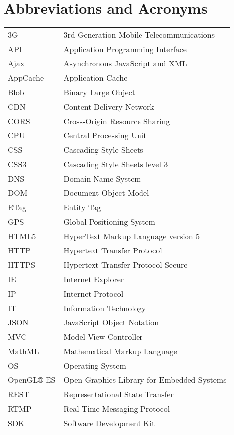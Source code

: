\chapter*{Abbreviations and Acronyms}

\noindent
\begin{longtable}{@{}p{}p{}@{}}

3G & 3rd Generation Mobile Telecommunications\\
API & Application Programming Interface\\
Ajax & Asynchronous JavaScript and XML\\
AppCache & Application Cache\\
Blob & Binary Large Object\\
CDN & Content Delivery Network\\
CORS & Cross-Origin Resource Sharing\\
CPU & Central Processing Unit\\
CSS & Cascading Style Sheets\\
CSS3 & Cascading Style Sheets level 3\\
DNS & Domain Name System\\
DOM & Document Object Model\\
ETag & Entity Tag\\
GPS & Global Positioning System\\
HTML5 & HyperText Markup Language version 5\\
HTTP & Hypertext Transfer Protocol\\
HTTPS & Hypertext Transfer Protocol Secure\\
IE & Internet Explorer\\
IP & Internet Protocol\\
IT & Information Technology\\
JSON & JavaScript Object Notation\\
MVC & Model-View-Controller\\
MathML & Mathematical Markup Language\\
OS & Operating System\\
OpenGL® ES & Open Graphics Library for Embedded Systems\\
REST & Representational State Transfer\\
RTMP & Real Time Messaging Protocol\\
SDK & Software Development Kit\\

\end{longtable}
